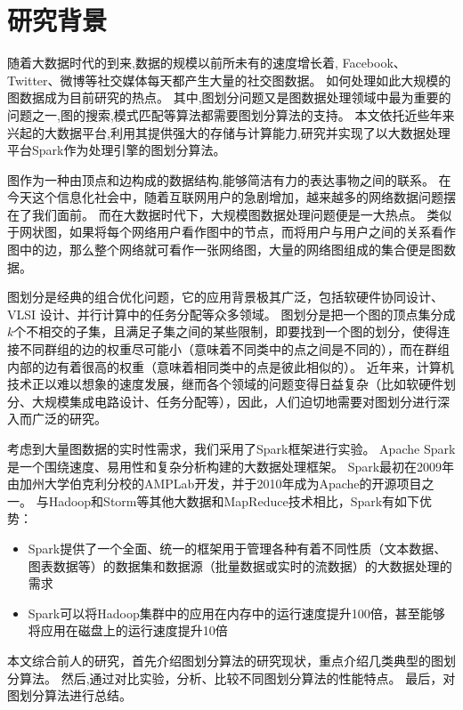 \section{研究背景}

随着大数据时代的到来,数据的规模以前所未有的速度增长着, Facebook、Twitter、微博等社交媒体每天都产生大量的社交图数据。
如何处理如此大规模的图数据成为目前研究的热点。
其中,图划分问题又是图数据处理领域中最为重要的问题之一,图的搜索,模式匹配等算法都需要图划分算法的支持。
本文依托近些年来兴起的大数据平台,利用其提供强大的存储与计算能力,研究并实现了以大数据处理平台Spark作为处理引擎的图划分算法。


图作为一种由顶点和边构成的数据结构,能够简洁有力的表达事物之间的联系。
在今天这个信息化社会中，随着互联网用户的急剧增加，越来越多的网络数据问题摆在了我们面前。
而在大数据时代下，大规模图数据处理问题便是一大热点。
类似于网状图，如果将每个网络用户看作图中的节点，而将用户与用户之间的关系看作图中的边，那么整个网络就可看作一张网络图，大量的网络图组成的集合便是图数据。

图划分是经典的组合优化问题，它的应用背景极其广泛，包括软硬件协同设计、VLSI 设计、并行计算中的任务分配等众多领域。
图划分是把一个图的顶点集分成$k$个不相交的子集，且满足子集之间的某些限制，即要找到一个图的划分，使得连接不同群组的边的权重尽可能小（意味着不同类中的点之间是不同的），而在群组内部的边有着很高的权重（意味着相同类中的点是彼此相似的）。
近年来，计算机技术正以难以想象的速度发展，继而各个领域的问题变得日益复杂（比如软硬件划分、大规模集成电路设计、任务分配等），因此，人们迫切地需要对图划分进行深入而广泛的研究。

考虑到大量图数据的实时性需求，我们采用了Spark框架进行实验。
Apache Spark是一个围绕速度、易用性和复杂分析构建的大数据处理框架。
Spark最初在2009年由加州大学伯克利分校的AMPLab开发，并于2010年成为Apache的开源项目之一。
与Hadoop和Storm等其他大数据和MapReduce技术相比，Spark有如下优势：

\begin{itemize}
    \item Spark提供了一个全面、统一的框架用于管理各种有着不同性质（文本数据、图表数据等）的数据集和数据源（批量数据或实时的流数据）的大数据处理的需求
    \item Spark可以将Hadoop集群中的应用在内存中的运行速度提升100倍，甚至能够将应用在磁盘上的运行速度提升10倍
\end{itemize}

本文综合前人的研究，首先介绍图划分算法的研究现状，重点介绍几类典型的图划分算法。
然后,通过对比实验，分析、比较不同图划分算法的性能特点。
最后，对图划分算法进行总结。
